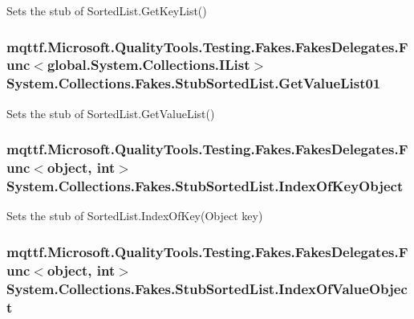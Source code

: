 Sets the stub of Sorted\-List.\-Get\-Key\-List()

\hypertarget{class_system_1_1_collections_1_1_fakes_1_1_stub_sorted_list_a084d696bff9ab14c14689c59024c2f50}{
\subsubsection[{Get\-Value\-List01}]{\setlength{\rightskip}{0pt plus 5cm}mqttf.\-Microsoft.\-Quality\-Tools.\-Testing.\-Fakes.\-Fakes\-Delegates.\-Func$<$global.\-System.\-Collections.\-I\-List$>$ System.\-Collections.\-Fakes.\-Stub\-Sorted\-List.\-Get\-Value\-List01}}\label{class_system_1_1_collections_1_1_fakes_1_1_stub_sorted_list_a084d696bff9ab14c14689c59024c2f50}


Sets the stub of Sorted\-List.\-Get\-Value\-List()

\hypertarget{class_system_1_1_collections_1_1_fakes_1_1_stub_sorted_list_a353d4f0bc8ced5d4ef27c3d3b7e5b030}{
\subsubsection[{Index\-Of\-Key\-Object}]{\setlength{\rightskip}{0pt plus 5cm}mqttf.\-Microsoft.\-Quality\-Tools.\-Testing.\-Fakes.\-Fakes\-Delegates.\-Func$<$object, int$>$ System.\-Collections.\-Fakes.\-Stub\-Sorted\-List.\-Index\-Of\-Key\-Object}}\label{class_system_1_1_collections_1_1_fakes_1_1_stub_sorted_list_a353d4f0bc8ced5d4ef27c3d3b7e5b030}


Sets the stub of Sorted\-List.\-Index\-Of\-Key(\-Object key)

\hypertarget{class_system_1_1_collections_1_1_fakes_1_1_stub_sorted_list_ab8c5b549f79e76640161cb242cdfd30f}{
\subsubsection[{Index\-Of\-Value\-Object}]{\setlength{\rightskip}{0pt plus 5cm}mqttf.\-Microsoft.\-Quality\-Tools.\-Testing.\-Fakes.\-Fakes\-Delegates.\-Func$<$object, int$>$ System.\-Collections.\-Fakes.\-Stub\-Sorted\-List.\-Index\-Of\-Value\-Object}}\label{class_system_1_1_collections_1_1_fakes_1_1_stub_sorted_list_ab8c5b549f79e76640161cb242cdfd30f}


